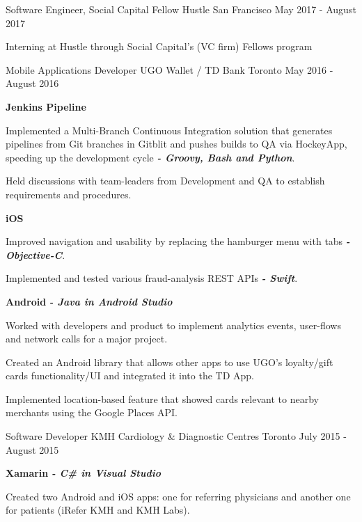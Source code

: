 \begin{cventries}
	\cventry
	{Software Engineer, Social Capital Fellow}
	{Hustle}
	{San Francisco}
	{May 2017 - August 2017}
	{
		\begin{cvitems}
			\item {Interning at Hustle through Social Capital's (VC firm) Fellows program}
		\end{cvitems}
	}
  \cventry
    {Mobile Applications Developer}
    {UGO Wallet / TD Bank}
    {Toronto}
    {May 2016 - August 2016}
    {
      \begin{cvitems}
        \item[]{\vspace{0.08cm}\textbf {Jenkins Pipeline}}
        \item {\vspace{0.08cm}Implemented a Multi-Branch Continuous Integration solution that generates pipelines from Git branches in Gitblit and pushes builds to QA via HockeyApp, speeding up the development cycle \textbf{\textit{ - Groovy, Bash and Python}}.}
        \item {Held discussions with team-leaders from Development and QA to establish requirements and procedures.\vspace{0.08cm}}
        \item[]{\textbf {iOS}}
        \item {\vspace{0.08cm}Improved navigation and usability by replacing the hamburger menu with tabs \textit{\textbf{ - Objective-C}}.}
        \item {Implemented and tested various fraud-analysis REST APIs \textit{\textbf{ - Swift}}.\vspace{0.08cm}}
        \item[]{\textbf {Android} \textit{\textbf { - Java in Android Studio}}}
        \item {\vspace{0.08cm}Worked with developers and product to implement analytics events, user-flows and network calls for a major project.\vspace{0.00cm}}
        \item {Created an Android library that allows other apps to use UGO's loyalty/gift cards functionality/UI and integrated it into the TD App.}
        \item {Implemented location-based feature that showed cards relevant to nearby merchants using the Google Places API.}
      \end{cvitems}
    }
  \cventry
    {Software Developer}
    {KMH Cardiology \& Diagnostic Centres}
    {Toronto}
    {July 2015 - August 2015}
    {
      \begin{cvitems}
        \item[]{\textbf {Xamarin} \textit{\textbf { - C\# in Visual Studio}}}
        \item{Created two Android and iOS apps: one for referring physicians and another one for patients (iRefer KMH and KMH Labs).}
      \end{cvitems}
    }
\end{cventries}
